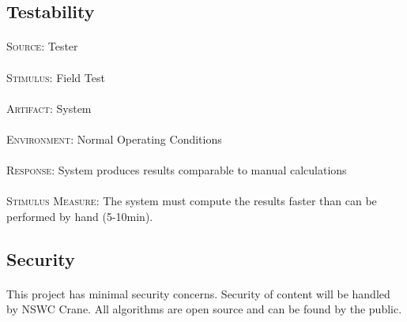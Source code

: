 \subsection{Testability}
\paragraph{}\textsc{Source:} Tester
\paragraph{}\textsc{Stimulus:} Field Test
\paragraph{}\textsc{Artifact:} System
\paragraph{}\textsc{Environment:} Normal Operating Conditions
\paragraph{}\textsc{Response:} System produces results comparable to manual calculations
\paragraph{}\textsc{Stimulus Measure:} The system must compute the results faster than can be performed by hand (5-10min).

\subsection{Security}
\paragraph{} This project has minimal security concerns.  Security of content will be handled by NSWC Crane.  All algorithms are open source and can be found by the public. 
